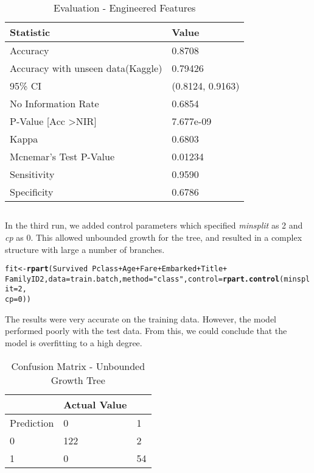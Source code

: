 \documentclass[a4paper,10pt]{report}\usepackage[]{graphicx}\usepackage[]{color}
\makeatletter
\newcommand{\hlnum}[1]{\textcolor[rgb]{0.686,0.059,0.569}{#1}}%
\newcommand{\hlstr}[1]{\textcolor[rgb]{0.192,0.494,0.8}{#1}}%
\newcommand{\hlopt}[1]{\textcolor[rgb]{0,0,0}{#1}}%
\newcommand{\hlstd}[1]{\textcolor[rgb]{0.345,0.345,0.345}{#1}}%
\newcommand{\hlkwb}[1]{\textcolor[rgb]{0.69,0.353,0.396}{#1}}%
\newcommand{\hlkwc}[1]{\textcolor[rgb]{0.333,0.667,0.333}{#1}}%
\newcommand{\hlkwd}[1]{\textcolor[rgb]{0.737,0.353,0.396}{\textbf{#1}}}%
\newenvironment{kframe}{%
 \def\at@end@of@kframe{}%
 \ifinner\ifhmode%
  \def\at@end@of@kframe{\end{minipage}}%
  \begin{minipage}{\columnwidth}%
 \fi\fi%
 \def\FrameCommand##1{\hskip\@totalleftmargin \hskip-\fboxsep
 \colorbox{shadecolor}{##1}\hskip-\fboxsep
     \hskip-\linewidth \hskip-\@totalleftmargin \hskip\columnwidth}%
 \MakeFramed {\advance\hsize-\width
   \@totalleftmargin\z@ \linewidth\hsize
   \@setminipage}}%
 {\par\unskip\endMakeFramed%
 \at@end@of@kframe}
\newenvironment{knitrout}{}{} %
\makeatother
\begin{document}
\begin{table}
    \begin{tabular}{|l|l|}
    \hline
    Statistic              & Value           \\ \hline
    Accuracy               & 0.8708          \\
    Accuracy with unseen data(Kaggle)               & 0.79426 \\ 
    95\% CI                & (0.8124, 0.9163) \\
    No Information Rate    & 0.6854          \\
    P-Value [Acc \textgreater NIR]    &  7.677e-09      \\
    Kappa                  &  0.6803         \\
    Mcnemar's Test P-Value & 0.01234          \\
    Sensitivity            &  0.9590         \\
    Specificity            & 0.6786          \\ \hline
    \end{tabular}
    \caption{Evaluation - Engineered Features}
\end{table}
\subsection{}
In the third run, we added control parameters which specified \emph{minsplit} as 2 and \emph{cp} as 0. This allowed unbounded growth for the tree, and resulted in a complex structure with large a number of branches.
\begin{knitrout}
\color{fgcolor}\begin{kframe}
\begin{alltt}
\hlstd{fit} \hlkwb{<-} \hlkwd{rpart}\hlstd{(Survived} \hlopt{~} \hlstd{Pclass} \hlopt{+} \hlstd{Age} \hlopt{+} \hlstd{Fare} \hlopt{+} \hlstd{Embarked} \hlopt{+} \hlstd{Title} \hlopt{+}
    \hlstd{FamilyID2,} \hlkwc{data} \hlstd{= train.batch,} \hlkwc{method} \hlstd{=} \hlstr{"class"}\hlstd{,} \hlkwc{control} \hlstd{=} \hlkwd{rpart.control}\hlstd{(}\hlkwc{minsplit} \hlstd{=} \hlnum{2}\hlstd{,}
    \hlkwc{cp} \hlstd{=} \hlnum{0}\hlstd{))}
\end{alltt}
\end{kframe}
\end{knitrout}
The results were very accurate on the training data. However, the model performed poorly with the test data. From this, we could conclude that the model is overfitting to a high degree. 
 \begin{table}
    \begin{tabular}{|l|l|l|}
    \hline
    ~          & Actual Value  & ~  \\ \hline
    Prediction & 0             & 1  \\ \hline
    0          & 122           & 2 \\
    1          & 0             & 54 \\ \hline
    \end{tabular}
    \caption{Confusion Matrix - Unbounded Growth Tree}
\end{table}
\end{document}
